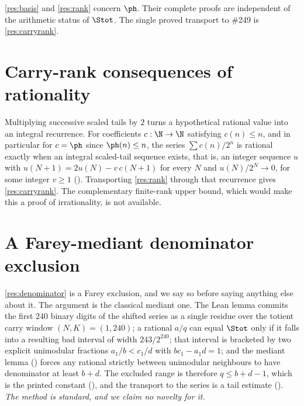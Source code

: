 \begin{remark}
\ref{res:basis} and \ref{res:rank} concern $\ph$.  Their complete proofs are
independent of the arithmetic status of $\Stot$.  The single proved transport
to \#249 is \ref{res:carryrank}.
\end{remark}



\section{Carry-rank consequences of rationality}\label{sec:carry-rank}

Multiplying successive scaled tails by $2$ turns a hypothetical rational
value into an integral recurrence.  For coefficients $c:\N\to\N$ satisfying
$c(n)\le n$, and in particular for $c=\ph$ since $\ph(n)\le n$, the series
$\sum c(n)/2^n$ is
rational exactly when an integral scaled-tail sequence exists, that is, an
integer sequence $u$ with
$u(N+1)=2u(N)-v\,c(N+1)$ for every $N$ and $u(N)/2^N\to0$, for some integer
$v\ge1$
().
Transporting \ref{res:rank} through that recurrence gives \ref{res:carryrank}.
The complementary finite-rank upper bound, which would make this a proof of
irrationality, is not available.



\section{A Farey-mediant denominator exclusion}\label{sec:denominator}

\ref{res:denominator} is a Farey exclusion, and we say so before saying
anything else about it.  The argument is the classical mediant one.  The Lean
lemma commits the first $240$ binary digits of the shifted series as a single
residue over the totient carry window $(N,K)=(1,240)$; a rational $a/q$ can
equal $\Stot$ only if it falls into a resulting bad interval of width
$243/2^{240}$; that interval is bracketed by two explicit unimodular fractions
$a_1/b<c_1/d$ with $bc_1-a_1d=1$; and the mediant lemma
() forces any
rational strictly between unimodular neighbours to have denominator at least
$b+d$.  The excluded range is therefore $q\le b+d-1$, which is the printed
constant
(),
and the transport to the series is a tail estimate
().
\emph{The method is standard, and we claim no novelty for it.}

